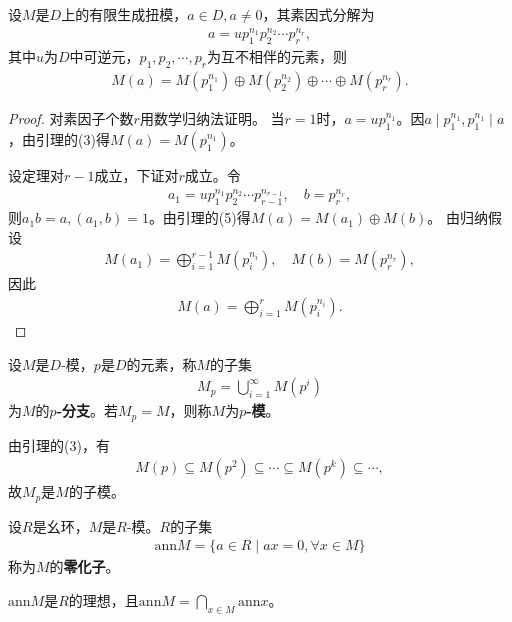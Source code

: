 \documentclass[../../main.tex]{subfiles}%
\begin{document}
\begin{theorem}
设$M$是$D$上的有限生成扭模，$a\in D,a\neq0$，其素因式分解为
\begin{align*}
a=up_1^{n_1}p_2^{n_2}\cdots p_r^{n_r},
\end{align*}
其中$u$为$D$中可逆元，$p_1,p_2,\cdots,p_r$为互不相伴的元素，则
\begin{align*}
M(a)=M(p_1^{n_1})\oplus M(p_2^{n_2})\oplus\cdots\oplus M(p_r^{n_r}).
\end{align*}
\end{theorem}
\begin{proof}
对素因子个数$r$用数学归纳法证明。
当$r=1$时，$a=up_1^{n_1}$。因$a\mid p_1^{n_1},p_1^{n_1}\mid a$，由引理的(3)得$M(a)=M(p_1^{n_1})$。

设定理对$r-1$成立，下证对$r$成立。令
\begin{align*}
a_1=up_1^{n_1}p_2^{n_2}\cdots p_{r-1}^{n_{r-1}},\quad b=p_r^{n_r},
\end{align*}
则$a_1b=a,(a_1,b)=1$。由引理的(5)得$M(a)=M(a_1)\oplus M(b)$。
由归纳假设
\begin{align*}
M(a_1)=\bigoplus\limits_{i=1}^{r-1}M(p_i^{n_i}),\quad M(b)=M(p_r^{n_r}),
\end{align*}
因此
\begin{align*}
M(a)=\bigoplus\limits_{i=1}^{r}M(p_i^{n_i}).
\end{align*}
\end{proof}

\begin{definition}
设$M$是$D$-模，$p$是$D$的元素，称$M$的子集
\begin{align*}
M_p=\bigcup\limits_{i=1}^{\infty}M(p^i)
\end{align*}
为$M$的\textbf{$p$-分支}。若$M_p=M$，则称$M$为\textbf{$p$-模}。
\end{definition}
\begin{remark}
由引理的(3)，有
\begin{align*}
M(p)\subseteq M(p^2)\subseteq\cdots\subseteq M(p^k)\subseteq\cdots,
\end{align*}
故$M_p$是$M$的子模。
\end{remark}

\begin{definition}
设$R$是幺环，$M$是$R$-模。$R$的子集
\begin{align*}
\mathrm{ann}M=\{a\in R\mid ax=0,\forall x\in M\}
\end{align*}
称为$M$的\textbf{零化子}。
\end{definition}
\begin{remark}
$\mathrm{ann}M$是$R$的理想，且$\mathrm{ann}M=\bigcap\limits_{x\in M}\mathrm{ann}x$。
\end{remark}
\end{document}
